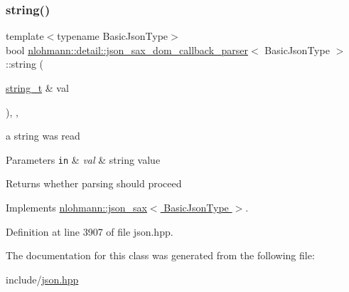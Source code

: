 \subsubsection{\texorpdfstring{string()}{string()}}
{\footnotesize\ttfamily template$<$typename Basic\+Json\+Type$>$ \\
bool \hyperlink{classnlohmann_1_1detail_1_1json__sax__dom__callback__parser}{nlohmann\+::detail\+::json\+\_\+sax\+\_\+dom\+\_\+callback\+\_\+parser}$<$ Basic\+Json\+Type $>$\+::string (\begin{DoxyParamCaption}\item[{\hyperlink{structnlohmann_1_1json__sax_ae01977a9f3c5b3667b7a2929ed91061e}{string\+\_\+t} \&}]{val }\end{DoxyParamCaption})\hspace{0.3cm}{\ttfamily [inline]}, {\ttfamily [override]}, {\ttfamily [virtual]}}



a string was read 


\begin{DoxyParams}[1]{Parameters}
\mbox{\tt in}  & {\em val} & string value \\
\hline
\end{DoxyParams}
\begin{DoxyReturn}{Returns}
whether parsing should proceed 
\end{DoxyReturn}


Implements \hyperlink{structnlohmann_1_1json__sax_a07eab82f6c82d606787eee9ad73d2bda}{nlohmann\+::json\+\_\+sax$<$ Basic\+Json\+Type $>$}.



Definition at line 3907 of file json.\+hpp.



The documentation for this class was generated from the following file\+:\begin{DoxyCompactItemize}
\item 
include/\hyperlink{json_8hpp}{json.\+hpp}\end{DoxyCompactItemize}
